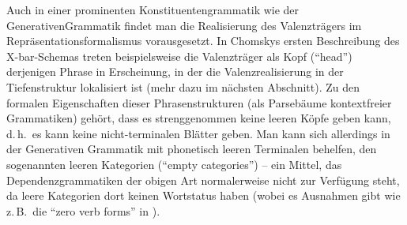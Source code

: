 Auch in einer prominenten Konstituentengrammatik wie der Generativen\linebreak Grammatik findet man die Realisierung des Valenzträgers im Repräsentationsformalismus vorausgesetzt. In Chomskys ersten Beschreibung des X-bar-Schemas \citep[210]{Chomsky:70} treten beispielsweise die Valenzträger als Kopf ("`head"') derjenigen Phrase in Erscheinung, in der die Valenzrealisierung in der Tiefenstruktur lokalisiert ist (mehr dazu im nächsten Abschnitt). Zu den formalen Eigenschaften dieser Phrasenstrukturen (als Parsebäume kontextfreier Grammatiken) gehört, dass es strenggenommen keine leeren Köpfe geben kann, d.\,h.\ es kann keine nicht-terminalen Blätter geben. Man kann sich allerdings in der Generativen Grammatik mit phonetisch leeren Terminalen behelfen, den sogenannten leeren Kategorien ("`empty categories"') -- ein Mittel, das Dependenzgrammatiken der obigen Art normalerweise nicht zur Verfügung steht, da leere Kategorien dort keinen Wortstatus haben (wobei es Ausnahmen gibt wie z.\,B.\ die "`zero verb forms"' in \citealt{Melcuk:09}).  \\

